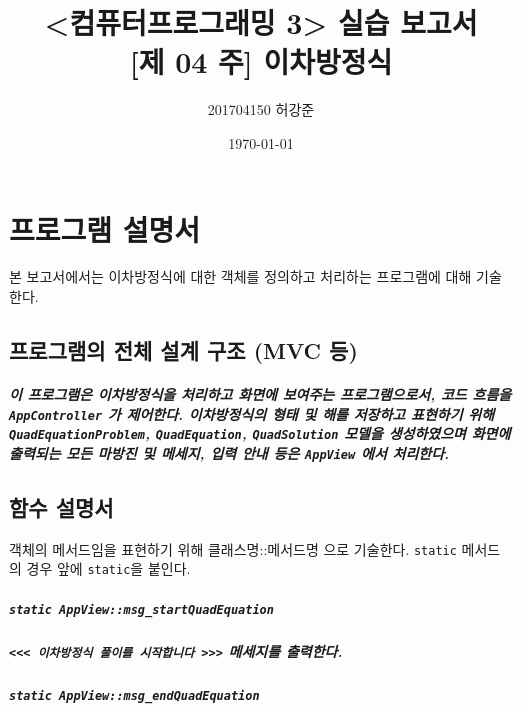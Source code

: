 \documentclass[UTF8]{report}
\title{%
    <컴퓨터프로그래밍 3> 실습 보고서 \\ 
    \large [제 04 주] 이차방정식}
\author{201704150 허강준}
\date{\today}
\begin{document}
    \maketitle
    \tableofcontents

    \chapter{프로그램 설명서}
        본 보고서에서는 이차방정식에 대한 객체를 정의하고 처리하는 프로그램에 대해 기술한다.

        \section{프로그램의 전체 설계 구조 (MVC 등)}
            
            \paragraph{%
                \normalfont 이 프로그램은 이차방정식을 처리하고 화면에 보여주는 프로그램으로서, 코드 흐름을 \texttt{AppController} 가 제어한다. 이차방정식의 형태 및 해를 저장하고 표현하기 위해 \texttt{QuadEquationProblem}, \texttt{QuadEquation}, \texttt{QuadSolution} 모델을 생성하였으며 화면에 출력되는 모든 마방진 및 메세지, 입력 안내 등은 \texttt{AppView} 에서 처리한다. 
            }

        \section{함수 설명서}

            객체의 메서드임을 표현하기 위해 클래스명::메서드명 으로 기술한다. \texttt{static} 메서드의 경우 앞에 \texttt{static}을 붙인다.

            \paragraph{\texttt{static AppView::msg\_startQuadEquation}}
            \paragraph{%
                \normalfont \texttt{<<< 이차방정식 풀이를 시작합니다 >>>} 메세지를 출력한다.
            }

            \paragraph{\texttt{static AppView::msg\_endQuadEquation}}
\end{document}
